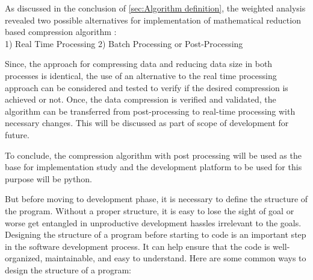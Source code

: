 As discussed in the conclusion of \ref{sec:Algorithm definition}, the weighted analysis revealed two possible alternatives for implementation of mathematical reduction based compression algorithm : \\
1) Real Time Processing    2) Batch Processing or Post-Processing 

Since, the approach for compressing data and reducing data size in both processes is identical, the use of an alternative to the real time processing approach can be considered and tested to verify if the desired compression is achieved or not. Once, the data compression is verified and validated, the algorithm can be transferred from post-processing to real-time processing with necessary changes. This will be discussed as part of scope of development for future.

To conclude, the compression algorithm with post processing will be used as the base for implementation study and the development platform to be used for this purpose will be python.

But before moving to development phase, it is necessary to define the structure of the program. Without a proper structure, it is easy to lose the sight of goal or worse get entangled in unproductive development hassles irrelevant to the goals. Designing the structure of a program before starting to code is an important step in the software development process. It can help ensure that the code is well-organized, maintainable, and easy to understand. Here are some common ways to design the structure of a program: 

